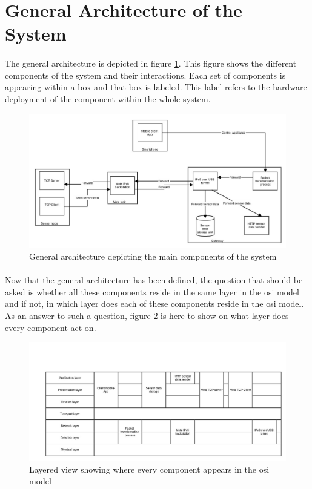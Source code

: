 \documentclass[oneside,12pt,a4paper,final]{book}
\begin{document}
\section{General Architecture of the System}
\paragraph{}
The general architecture is depicted in figure \ref{fig:gen_architecture}. This figure shows the different components of the system and their interactions. Each set of components is appearing within a box and that box is labeled. This label refers to the hardware deployment of the component within the whole system.
\begin{figure}[htbp]
\centering
\includegraphics[scale=0.40]{img/general_architecture.jpg}
\caption{General architecture depicting the main components of the system}
\label{fig:gen_architecture}
\end{figure}
\paragraph{}
Now that the general architecture has been defined, the question that should be asked is whether all these components reside in the same layer in the \gls{osi} model and if not, in which layer does each of these components reside in the \gls{osi} model. As an answer to such a question, figure \ref{fig:layered_view} is here to show on what layer does every component act on.

\begin{figure}[htbp]
\centering
\includegraphics[scale=0.40]{img/layered_view.jpg}
\caption{Layered view showing where every component appears in the \gls{osi} model}
\label{fig:layered_view}
\end{figure}
\end{document}
